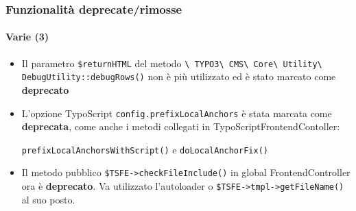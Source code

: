 \begin{frame}[fragile]
	\frametitle{Funzionalità deprecate/rimosse}
	\framesubtitle{Varie (3)}

	\begin{itemize}

		\item Il parametro \texttt{\$returnHTML} del metodo
			\small
				\texttt{\textbackslash
					TYPO3\textbackslash
					CMS\textbackslash
					Core\textbackslash
					Utility\textbackslash
					DebugUtility::debugRows()}
			\normalsize
			non è più utilizzato ed è stato marcato come \textbf{deprecato}

		\item L'opzione TypoScript
			\small\texttt{config.prefixLocalAnchors}\normalsize\space
			è stata marcata come \textbf{deprecata}, come anche i metodi collegati
			in TypoScriptFrontendContoller:

			\small\texttt{prefixLocalAnchorsWithScript()}\normalsize\space
			e
			\small\texttt{doLocalAnchorFix()}\normalsize

		\item Il metodo pubblico
			\small\texttt{\$TSFE->checkFileInclude()}\normalsize\space
			in global FrontendController ora è \textbf{deprecato}.
			Va utilizzato l'autoloader o \texttt{\$TSFE->tmpl->getFileName()}
			al suo posto.

	\end{itemize}

\end{frame}


